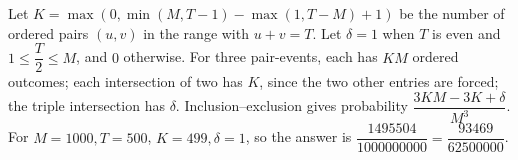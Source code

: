Let $K=\max(0,\min(M,T-1)-\max(1,T-M)+1)$ be the number of ordered pairs $(u,v)$ in the range with $u+v=T$. Let $\delta=1$ when $T$ is even and $1\le\dfrac{T}{2}\le M$, and $0$ otherwise. For three pair-events, each has $KM$ ordered outcomes; each intersection of two has $K$, since the two other entries are forced; the triple intersection has $\delta$. Inclusion--exclusion gives probability $\boxed{\dfrac{3KM-3K+\delta}{M^3}}$. For $M=1000,T=500$, $K=499,\delta=1$, so the answer is $\dfrac{1495504}{1000000000}=\boxed{\dfrac{93469}{62500000}}$.

